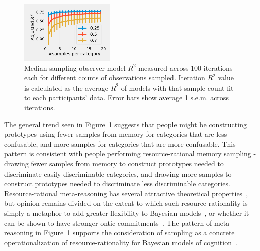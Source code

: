 \documentclass[10pt,letterpaper]{article}
\begin{document}
\begin{figure}[h!]
    \centering
    \includegraphics[width=0.4\textwidth]{results/meta.pdf}
    \caption{Median sampling observer model $R^2$ measured across 100 iterations each for different counts of observations sampled. Iteration $R^2$ value is calculated as the average $R^2$ of models with that sample count fit to each participants' data. Error bars show average 1 s.e.m. across iterations.}
    \label{fig:meta}
\end{figure}

The general trend seen in Figure~\ref{fig:meta} suggests that people might be constructing prototypes using fewer samples from memory for categories that are less confusable, and more samples for categories that are more confusable. This pattern is consistent with people performing resource-rational memory sampling - drawing fewer samples from memory to construct prototypes needed to discriminate easily discriminable categories, and drawing more samples to construct prototypes needed to discriminate less discriminable categories. Resource-rational meta-reasoning has several attractive theoretical properties~\cite{griffiths2015rational}, but opinion remains divided on the extent to which such resource-rationality is simply a metaphor to add greater flexibility to Bayesian models~\cite{rahnev2020resource}, or whether it can be shown to have stronger ontic commitments~\cite{griffiths2015rational}. The pattern of meta-reasoning in Figure~\ref{fig:meta} supports the consideration of sampling as a concrete operationalization of resource-rationality for Bayesian models of cognition~\cite{srivastava2014frugal, sanborn2016bayesian}. 


\end{document}
